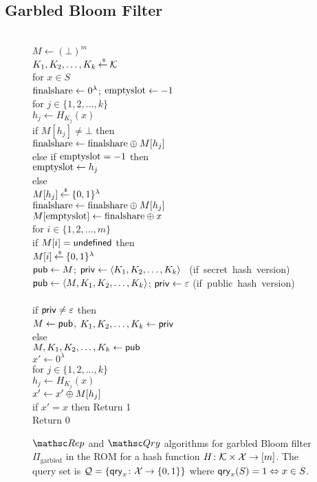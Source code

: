 \subsection{Garbled Bloom Filter}
\begin{figure}
\centering
{}
{
\\
$M \gets (\bot)^m$\\
$K_1,K_2,\ldots, K_k {\:\stackrel{{\scriptscriptstyle \hspace{0.2em}\$}} {\leftarrow}\:} {\cal K}$\\
for $x \in S$\\
\nudge $\mathrm{finalshare} \gets 0^\lambda$; $\mathrm{emptyslot} \gets -1$\\
\nudge for $j \in \{1,2,\ldots, k\}$\\
\nudge \nudge $h_j \gets H_{K_j}(x)$\\
\nudge \nudge if $M[h_j] \neq \bot$ then\\
\nudge \nudge \nudge $\mathrm{finalshare} \gets \mathrm{finalshare} {\:\oplus\:} M[h_j]$\\
\nudge \nudge else if $\mathrm{emptyslot} = -1$ then\\
\nudge \nudge \nudge $\mathrm{emptyslot} \gets h_j$\\
\nudge \nudge else\\
\nudge \nudge \nudge $M[h_j] {\:\stackrel{{\scriptscriptstyle \hspace{0.2em}\$}} {\leftarrow}\:} \{0,1\}^\lambda$\\
\nudge \nudge \nudge $\mathrm{finalshare} \gets \mathrm{finalshare} {\:\oplus\:} M[h_j]$\\
\nudge $M[\mathrm{emptyslot}] \gets \mathrm{finalshare} {\:\oplus\:} x$\\
for $i \in \{1,2,\ldots, m\}$\\
\nudge if $M[i] = \mathsf{undefined}$ then\\
\nudge \nudge  $M[i] {\:\stackrel{{\scriptscriptstyle \hspace{0.2em}\$}} {\leftarrow}\:} \{0,1\}^\lambda$\\
${\sf pub} \gets M$; ${\sf priv} \gets \langle K_1,K_2,\ldots,K_k \rangle$ \mbox{ (if secret hash version)}\\
${\sf pub} \gets \langle M,K_1,K_2,\ldots,K_k \rangle$; ${\sf priv} \gets \varepsilon$ \mbox{(if public hash version)}\\

\medskip
{}\\
if ${\sf priv} \neq \varepsilon$ then\\
\nudge $M \gets {\sf pub}$, $K_1,K_2,\ldots,K_k \gets {\sf priv}$\\
else\\
\nudge $M,K_1,K_2,\ldots,K_k \gets {\sf pub}$\\
$x' \gets 0^\lambda$\\
for $j \in \{1,2,\dots,k\}$\\
\nudge $h_j \gets H_{K_j}(x)$\\
\nudge $x' \gets x' {\:\oplus\:} M[h_j]$\\
if $x' =x $ then Return 1\\
Return 0
}
\caption{ $\Rep$ and $\Qry$ algorithms for garbled Bloom
  filter $\Pi_{\mathrm{garbled}}$ in the ROM for a hash function $H\colon {\cal K} \times 
 {\cal X} \to [m]$. The query set is ${\cal Q}=\{\mathsf{qry}_x\colon
  {\cal X} \to \{0,1\}\}$ where $\mathsf{qry}_x(S)=1 \Leftrightarrow x \in S$.}

\end{figure}


